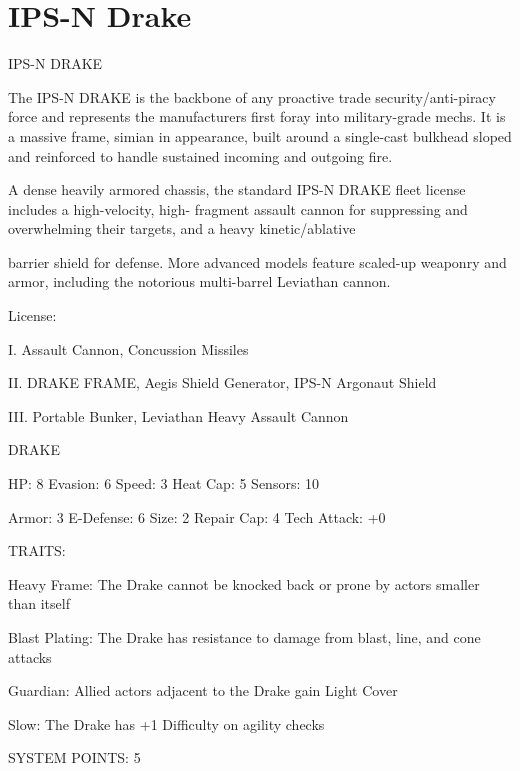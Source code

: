 \section{IPS-N Drake}


                                                    IPS-N DRAKE

The IPS-N DRAKE is the backbone of any proactive trade security/anti-piracy force and represents the
manufacturers first foray into military-grade mechs. It is a massive frame, simian in appearance, built
around a single-cast bulkhead sloped and reinforced to handle sustained incoming and outgoing fire.

A dense heavily armored chassis, the standard IPS-N DRAKE fleet license includes a high-velocity, high-
fragment assault cannon for suppressing and overwhelming their targets, and a heavy kinetic/ablative

barrier shield for defense. More advanced models feature scaled-up weaponry and armor, including the
notorious multi-barrel Leviathan cannon.




                                                     License:

I. Assault Cannon, Concussion Missiles

II. DRAKE FRAME, Aegis Shield Generator, IPS-N Argonaut Shield

III. Portable Bunker, Leviathan Heavy Assault Cannon


                                                     DRAKE

  HP: 8           Evasion: 6                             Speed: 3            Heat Cap: 5        Sensors: 10

  Armor: 3        E-Defense: 6                           Size: 2             Repair Cap: 4      Tech Attack:
                                                                                                +0

                                                     TRAITS:

  Heavy Frame: The Drake cannot be knocked back or prone by actors smaller than itself

  Blast Plating: The Drake has resistance to damage from blast, line, and cone attacks

  Guardian: Allied actors adjacent to the Drake gain Light Cover

  Slow: The Drake has +1 Difficulty on agility checks

                                               SYSTEM POINTS: 5

